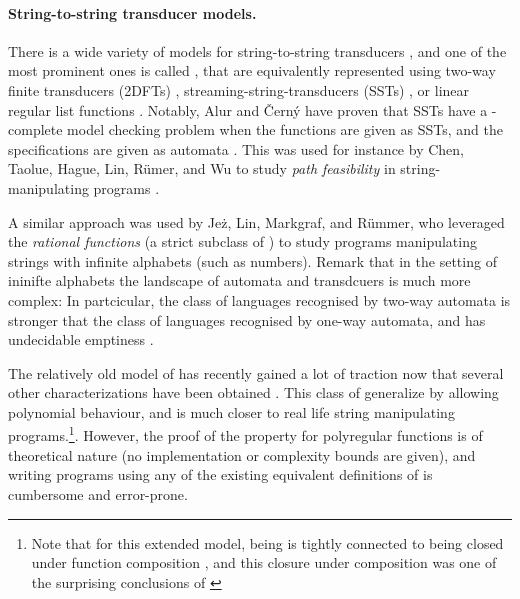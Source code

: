 \paragraph{String-to-string transducer models.} There is a wide variety of
models for string-to-string transducers \cite{MUSC19}, and one of the most
prominent ones is called , that are
equivalently represented using two-way finite transducers (2DFTs)
\cite{RASCO59}, streaming-string-transducers (SSTs) \cite{ALUR11}, or linear
regular list functions \cite{BDK18}. Notably, Alur and Černý have proven
that SSTs have a \PSPACE-complete model checking problem when the functions are
given as SSTs, and the specifications are given as automata
\cite[Theorem 13]{ALCE11}. This was used for instance by Chen, Taolue, Hague,
Lin, Rümer, and Wu to study \emph{path feasibility} in string-manipulating
programs \cite{CHLRW19}.

A similar approach was used by Jeż, Lin, Markgraf, and Rümmer,
who leveraged the \emph{rational functions} (a strict subclass of ) 
to study programs manipulating strings with infinite alphabets (such as numbers). 
Remark that in the setting of ininifte alphabets the landscape of automata and transdcuers
is much more complex: In partcicular, the class of languages recognised by two-way automata is 
stronger that the class of languages recognised by one-way automata, and has undecidable emptiness
\cite[Figure 1.1]{BOJAN19}.

\AP The relatively old model of  \cite{ENMA02} has recently gained a lot of traction now that
several other characterizations have been obtained
\cite{bojanczyk2018polyregular,bojanczyk2019string}. This class of
 generalize  by
allowing polynomial behaviour, and is much closer to real life string
manipulating programs.\footnote{Note that for this extended model, being  is tightly connected to being closed under function composition
\cite[Proposition III.3]{FIRELH25}, and this closure under composition was one of the surprising
conclusions of \cite{bojanczyk2018polyregular}}.
However, the proof of the  property for polyregular 
functions is of theoretical nature (no implementation or complexity bounds are given),
and writing programs using any of the existing equivalent definitions of
 is cumbersome and error-prone.

